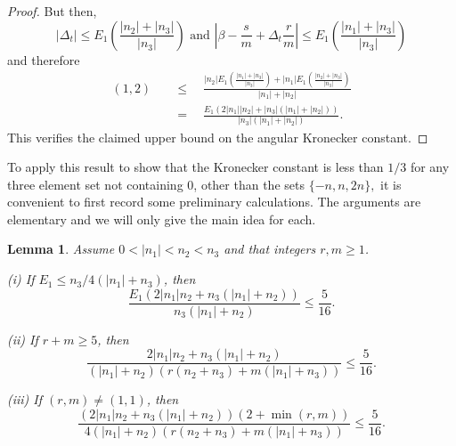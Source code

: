 \documentclass{amsart}
\newtheorem{lemma}{Lemma}
\begin{document}
\begin{proof}
But then,
$$
\left\vert \Delta _{t}\right\vert \leq E_{1}\left( \frac{\left\vert
n_{2}\right\vert +\left\vert n_{3}\right\vert }{\left\vert n_{3}\right\vert }\right) \text{ and }\left\vert \beta -\frac{s}{m}+\Delta _{t}\frac{r}{m}\right\vert \leq E_{1}\left( \frac{\left\vert n_{1}\right\vert +\left\vert
n_{3}\right\vert }{\left\vert n_{3}\right\vert }\right)
$$
and therefore
$$
\begin{aligned}
(1,2) &\quad \leq \quad\frac{\left\vert n_{2}\right\vert E_{1}\left( \frac{\left\vert
n_{1}\right\vert +\left\vert n_{3}\right\vert }{\left\vert n_{3}\right\vert }\right) +\left\vert n_{1}\right\vert E_{1}\left( \frac{\left\vert
n_{2}\right\vert +\left\vert n_{3}\right\vert }{\left\vert n_{3}\right\vert }\right) }{\left\vert n_{1}\right\vert +\left\vert n_{2}\right\vert } \\
&\quad=\quad\frac{E_{1}\left( 2\left\vert n_{1}\right\vert \left\vert
n_{2}\right\vert +\left\vert n_{3}\right\vert (\left\vert n_{1}\right\vert
+\left\vert n_{2}\right\vert )\right) }{\left\vert n_{3}\right\vert
(\left\vert n_{1}\right\vert +\left\vert n_{2}\right\vert )}.
\end{aligned}
$$
This verifies the claimed upper bound on the angular Kronecker constant.
\end{proof}

To apply this result to show that the Kronecker constant is less than $1/3$
for any three element set not containing $0$, other than the sets $\{-n,n,2n\},$ it is convenient to first record some preliminary
calculations. The arguments are elementary and we will only give the main
idea for each.

\begin{lemma}
\label{L1}Assume $0<\left\vert n_{1}\right\vert <n_{2}<n_{3}$ and that
integers $r,m\geq 1$.

(i) If $E_{1}\leq n_{3}/4(\left\vert n_{1}\right\vert +n_{3})$, then
$$
\frac{E_{1}\left( 2\left\vert n_{1}\right\vert n_{2}+n_{3}(\left\vert
n_{1}\right\vert +n_{2})\right) }{n_{3}(\left\vert n_{1}\right\vert +n_{2})}\leq \frac{5}{16}.
$$

(ii) If $r+m\geq 5$, then$$
\frac{2\left\vert n_{1}\right\vert n_{2}+n_{3}(\left\vert n_{1}\right\vert
+n_{2})}{(\left\vert n_{1}\right\vert +n_{2})\left(
r(n_{2}+n_{3})+m(\left\vert n_{1}\right\vert +n_{3})\right) }\leq \frac{5}{16}.
$$

(iii) If $(r,m)\neq (1,1)$, then
$$
\frac{\left( 2\left\vert n_{1}\right\vert n_{2}+n_{3}(\left\vert
n_{1}\right\vert +n_{2})\right) (2+\min (r,m))}{4(\left\vert
n_{1}\right\vert +n_{2})\left( r(n_{2}+n_{3})+m(\left\vert n_{1}\right\vert
+n_{3})\right) }\leq \frac{5}{16}.
$$
\end{lemma}
\end{document}
